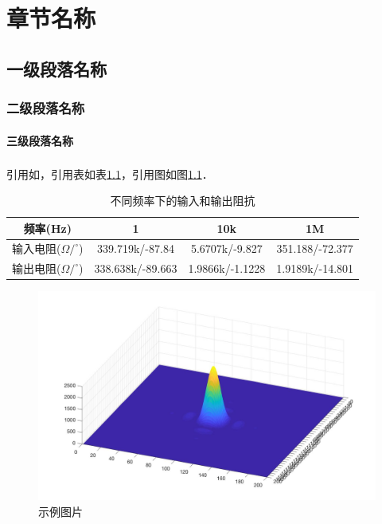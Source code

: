 \documentclass[UTF8,openany,AutoFakeBold,AutoFakeSlant,cs4size]{ctexbook}
\newcommand{\upcite}[1]{\textsuperscript{\cite{#1}}} %
\begin{document}
\normalsize
\linespread{1.5}\selectfont
{
	\fancyhf{}
	\fancyhead[RE,RO]{\leftmark}
	\fancyfoot[CO,CE]{~\thepage~}
	\renewcommand{\headrulewidth}{0.7pt}
	\renewcommand{\footrulewidth}{0pt}
}
\fancyhf{}
\fancyhead[RE,RO]{\leftmark}
\fancyfoot[CO,CE]{~\thepage~}
\renewcommand{\headrulewidth}{0.7pt}
\renewcommand{\footrulewidth}{0pt}



\chapter{章节名称}
\section{一级段落名称}
\subsection{二级段落名称}
\subsubsection{三级段落名称}
引用如\upcite{PhysRev.47.777}，引用表如表\ref{tab:input_output_r}，引用图如图\ref{fig:sample}．

\begin{table}[h]
\small %
\centering
\caption{不同频率下的输入和输出阻抗}
\label{tab:input_output_r}
\begin{tabular}{cccc} %
\toprule %
频率(Hz) & 1 & 10k & 1M \\
\midrule
输入电阻($\Omega/^\circ$) & 339.719k/-87.84 & 5.6707k/-9.827 & 351.188/-72.377\\
输出电阻($\Omega/^\circ$) & 338.638k/-89.663 & 1.9866k/-1.1228 & 1.9189k/-14.801 \\
\bottomrule
\end{tabular}
\end{table}

\begin{figure}[h]
\centering
\includegraphics[width=12cm]{Sample.jpg}
\caption{示例图片}
\label{fig:sample}
\end{figure}
\clearpage
\end{document}
